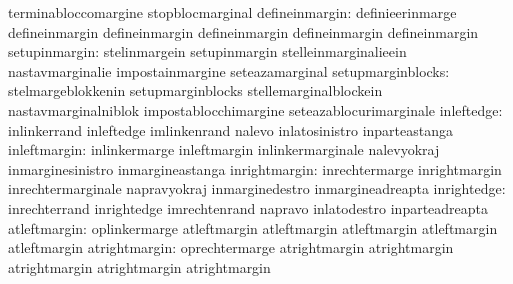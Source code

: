                                   terminabloccomargine             stopblocmarginal
defineinmargin: definieerinmarge defineinmargin
                defineinmargin   defineinmargin
                defineinmargin   defineinmargin
                   setupinmargin: stelinmargein                    setupinmargin
                                  stelleinmarginalieein            nastavmarginalie
                                  impostainmargine                 seteazamarginal
               setupmarginblocks: stelmargeblokkenin               setupmarginblocks
                                  stellemarginalblockein           nastavmarginalniblok
                                  impostablocchimargine            seteazablocurimarginale
                      inleftedge: inlinkerrand                     inleftedge
                                  imlinkenrand                     nalevo
                                  inlatosinistro                   inparteastanga
                    inleftmargin: inlinkermarge                    inleftmargin
                                  inlinkermarginale                nalevyokraj
                                  inmarginesinistro                inmargineastanga
                   inrightmargin: inrechtermarge                   inrightmargin
                                  inrechtermarginale               napravyokraj
                                  inmarginedestro                  inmargineadreapta
                     inrightedge: inrechterrand                    inrightedge
                                  imrechtenrand                    napravo
                                  inlatodestro                     inparteadreapta
 atleftmargin: oplinkermarge                    atleftmargin
               atleftmargin                     atleftmargin
               atleftmargin                     atleftmargin
atrightmargin: oprechtermarge                   atrightmargin
               atrightmargin                    atrightmargin
               atrightmargin                    atrightmargin

